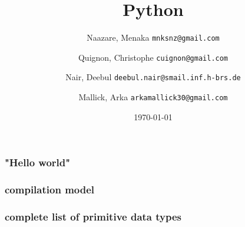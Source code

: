 \documentclass{beamer}
\begin{document}
\title{Python}
\subtitle{}
\author{
  Naazare, Menaka \texttt{mnksnz@gmail.com}  \\ \and
  Quignon, Christophe \texttt{cuignon@gmail.com}\\ \and
  Nair, Deebul \texttt{deebul.nair@smail.inf.h-brs.de} \\ \and
  Mallick, Arka \texttt{arkamallick30@gmail.com} \\ \and
} 
\date{\today}

\begin{frame}
\titlepage
\end{frame}





\begin{frame}
\frametitle{"Hello world"}
\framesubtitle{}
  
\end{frame}

\begin{frame}
\frametitle{compilation model}
\framesubtitle{}
  
\end{frame}

\begin{frame}
\frametitle{complete list of primitive data types}
\framesubtitle{}
  
\end{frame}
\end{document}
